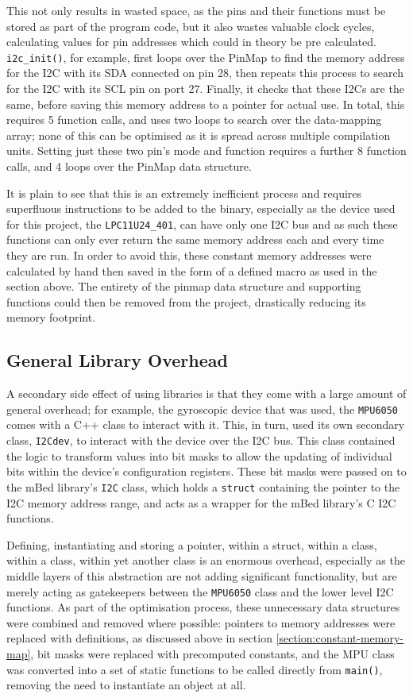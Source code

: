 This not only results in wasted space, as the pins and their functions must be stored as part of the program code, but it also wastes valuable clock cycles, calculating values for pin addresses which could in theory be pre calculated. \verb|i2c_init()|, for example, first loops over the PinMap to find the memory address for the I2C with its SDA connected on pin 28, then repeats this process to search for the I2C with its SCL pin on port 27. Finally, it checks that these I2Cs are the same, before saving this memory address to a pointer for actual use. In total, this requires 5 function calls, and uses two loops to search over the data-mapping array; none of this can be optimised as it is spread across multiple compilation units. Setting just these two pin's mode and function requires a further 8 function calls, and 4 loops over the PinMap data structure.

It is plain to see that this is an extremely inefficient process and requires superfluous instructions to be added to the binary, especially as the device used for this project, the \verb|LPC11U24_401|, can have only one I2C bus and as such these functions can only ever return the same memory address each and every time they are run. In order to avoid this, these constant memory addresses were calculated by hand then saved in the form of a defined macro as used in the section above. The entirety of the pinmap data structure and supporting functions could then be removed from the project, drastically reducing its memory footprint.

\subsection{General Library Overhead}

A secondary side effect of using libraries is that they come with a large amount of general overhead; for example, the gyroscopic device that was used, the \verb|MPU6050| comes with a C++ class to interact with it. This, in turn, used its own secondary class, \verb|I2Cdev|, to interact with the device over the I2C bus. This class contained the logic to transform values into bit masks to allow the updating of individual bits within the device's configuration registers. These bit masks were passed on to the mBed library's \verb|I2C| class, which holds a \verb|struct| containing the pointer to the I2C memory address range, and acts as a wrapper for the mBed library's C I2C functions.

Defining, instantiating and storing a pointer, within a struct, within a class, within a class, within yet another class is an enormous overhead, especially as the middle layers of this abstraction are not adding significant functionality, but are merely acting as gatekeepers between the \verb|MPU6050| class and the lower level I2C functions. As part of the optimisation process, these unnecessary data structures were combined and removed where possible: pointers to memory addresses were replaced with definitions, as discussed above in section \ref{section:constant-memory-map}, bit masks were replaced with precomputed constants, and the MPU class was converted into a set of static functions to be called directly from \verb|main()|, removing the need to instantiate an object at all.
